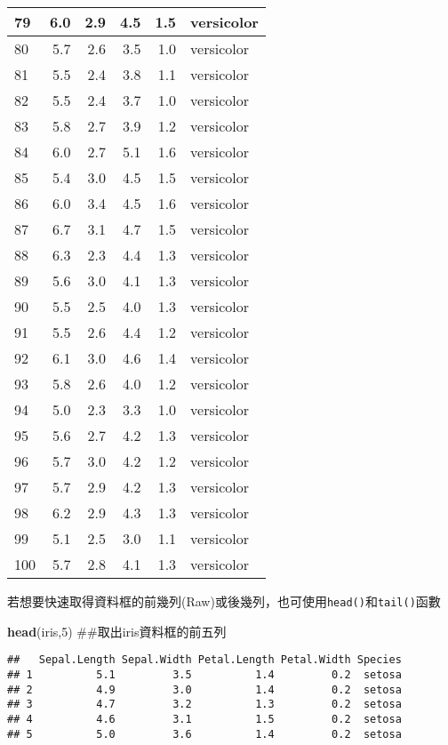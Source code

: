 \documentclass[]{book}
\newenvironment{Shaded}{\begin{snugshade}}{\end{snugshade}}
\newcommand{\KeywordTok}[1]{\textcolor[rgb]{0.13,0.29,0.53}{\textbf{{#1}}}}
\newcommand{\DecValTok}[1]{\textcolor[rgb]{0.00,0.00,0.81}{{#1}}}
\newcommand{\NormalTok}[1]{{#1}}
\begin{document}
\begin{tabular}{l|r|r|r|r|l}
\hline
79 & 6.0 & 2.9 & 4.5 & 1.5 & versicolor\\
\hline
80 & 5.7 & 2.6 & 3.5 & 1.0 & versicolor\\
\hline
81 & 5.5 & 2.4 & 3.8 & 1.1 & versicolor\\
\hline
82 & 5.5 & 2.4 & 3.7 & 1.0 & versicolor\\
\hline
83 & 5.8 & 2.7 & 3.9 & 1.2 & versicolor\\
\hline
84 & 6.0 & 2.7 & 5.1 & 1.6 & versicolor\\
\hline
85 & 5.4 & 3.0 & 4.5 & 1.5 & versicolor\\
\hline
86 & 6.0 & 3.4 & 4.5 & 1.6 & versicolor\\
\hline
87 & 6.7 & 3.1 & 4.7 & 1.5 & versicolor\\
\hline
88 & 6.3 & 2.3 & 4.4 & 1.3 & versicolor\\
\hline
89 & 5.6 & 3.0 & 4.1 & 1.3 & versicolor\\
\hline
90 & 5.5 & 2.5 & 4.0 & 1.3 & versicolor\\
\hline
91 & 5.5 & 2.6 & 4.4 & 1.2 & versicolor\\
\hline
92 & 6.1 & 3.0 & 4.6 & 1.4 & versicolor\\
\hline
93 & 5.8 & 2.6 & 4.0 & 1.2 & versicolor\\
\hline
94 & 5.0 & 2.3 & 3.3 & 1.0 & versicolor\\
\hline
95 & 5.6 & 2.7 & 4.2 & 1.3 & versicolor\\
\hline
96 & 5.7 & 3.0 & 4.2 & 1.2 & versicolor\\
\hline
97 & 5.7 & 2.9 & 4.2 & 1.3 & versicolor\\
\hline
98 & 6.2 & 2.9 & 4.3 & 1.3 & versicolor\\
\hline
99 & 5.1 & 2.5 & 3.0 & 1.1 & versicolor\\
\hline
100 & 5.7 & 2.8 & 4.1 & 1.3 & versicolor\\
\hline
\end{tabular}

若想要快速取得資料框的前幾列(Raw)或後幾列，也可使用\texttt{head()}和\texttt{tail()}函數

\begin{Shaded}
\begin{Highlighting}[]
\KeywordTok{head}\NormalTok{(iris,}\DecValTok{5}\NormalTok{) ##取出iris資料框的前五列}
\end{Highlighting}
\end{Shaded}

\begin{verbatim}
##   Sepal.Length Sepal.Width Petal.Length Petal.Width Species
## 1          5.1         3.5          1.4         0.2  setosa
## 2          4.9         3.0          1.4         0.2  setosa
## 3          4.7         3.2          1.3         0.2  setosa
## 4          4.6         3.1          1.5         0.2  setosa
## 5          5.0         3.6          1.4         0.2  setosa
\end{verbatim}
\end{document}
